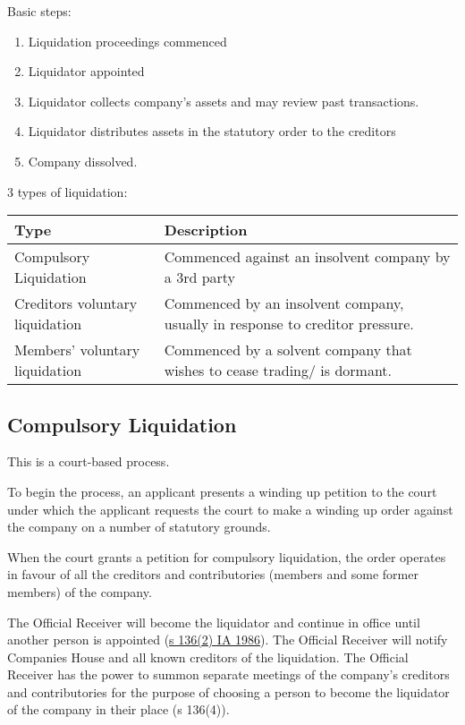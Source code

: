 \documentclass[
]{article}
\providecommand{\tightlist}{%
  \setlength{\itemsep}{0pt}\setlength{\parskip}{0pt}}
\begin{document}
Basic steps:

\begin{enumerate}
\tightlist
\item
  Liquidation proceedings commenced
\item
  Liquidator appointed
\item
  Liquidator collects company's assets and may review past transactions.
\item
  Liquidator distributes assets in the statutory order to the creditors
\item
  Company dissolved.
\end{enumerate}

3 types of liquidation:

\begin{longtable}[]{@{}ll@{}}
\toprule()
Type & Description \\
\midrule()
\endhead
Compulsory Liquidation & Commenced against an insolvent company by a 3rd
party \\
Creditors voluntary liquidation & Commenced by an insolvent company,
usually in response to creditor pressure. \\
Members' voluntary liquidation & Commenced by a solvent company that
wishes to cease trading/ is dormant. \\
\bottomrule()
\end{longtable}

\hypertarget{compulsory-liquidation}{%
\subsection{Compulsory Liquidation}\label{compulsory-liquidation}}

This is a court-based process.

To begin the process, an applicant presents a winding up petition to the
court under which the applicant requests the court to make a winding up
order against the company on a number of statutory grounds.

When the court grants a petition for compulsory liquidation, the order
operates in favour of all the creditors and contributories (members and
some former members) of the company.

The Official Receiver will become the liquidator and continue in office
until another person is appointed
(\href{https://www.legislation.gov.uk/ukpga/1986/45/section/136}{s
136(2) IA 1986}). The Official Receiver will notify Companies House and
all known creditors of the liquidation. The Official Receiver has the
power to summon separate meetings of the company's creditors and
contributories for the purpose of choosing a person to become the
liquidator of the company in their place (s 136(4)).
\end{document}
